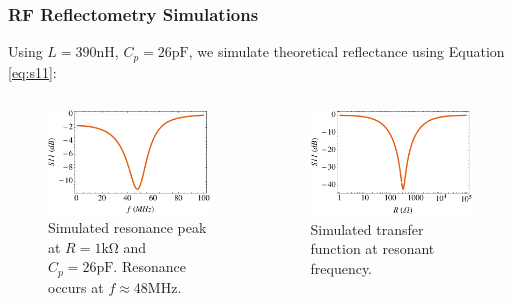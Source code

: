 \documentclass{beamer}
\begin{document}
\begin{frame}

    \frametitle{RF Reflectometry Simulations}
    Using $L = 390 \si{\nano\henry}$, $C_p = 26\si{\pico\farad}$, we simulate theoretical reflectance using Equation \ref{eq:s11}:
    \begin{columns}
        \begin{column}{0.5\textwidth}
            \begin{figure}
                \includegraphics[width=\textwidth]{S11_resonance.pdf}
                \caption{Simulated resonance peak at $R=1\si{\kilo\ohm}$ and $C_p = 26\si{\pico\farad}$. Resonance occurs at $f \approx 48\si{\mega\hertz}$.}
                \label{fig:resonancesim}
            \end{figure}
        \end{column}
        \begin{column}{0.5\textwidth}
            \begin{figure}
                \includegraphics[width = \textwidth]{S11_cs0db.pdf}
                \caption{Simulated transfer function at resonant frequency.}
                \label{fig:s11cs0db}
            \end{figure}
        \end{column}
    \end{columns}


\end{frame}
\end{document}
